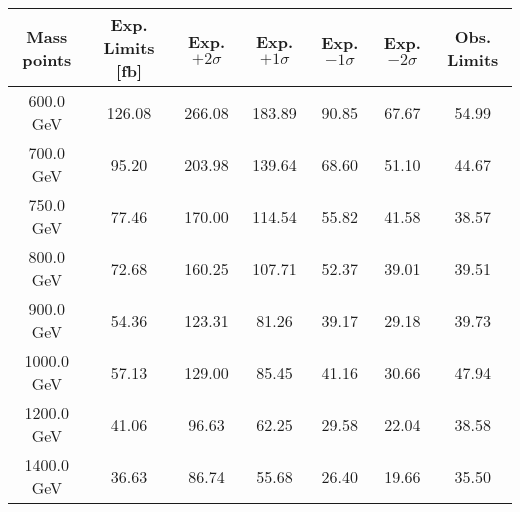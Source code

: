 
\begin{table}
\begin{center}
\begin{tabular}{c|cccccc}
\hline
\hline
Mass points & Exp. Limits [fb] & Exp. $+2\sigma$ & Exp. $+1\sigma$ &  Exp. $-1\sigma$  &  Exp. $-2\sigma$ & Obs. Limits \\
\hline
600.0 GeV  &  126.08  & 266.08  & 183.89  & 90.85  & 67.67   & 54.99\\
700.0 GeV  &  95.20  & 203.98  & 139.64  & 68.60  & 51.10   & 44.67\\
750.0 GeV  &  77.46  & 170.00  & 114.54  & 55.82  & 41.58   & 38.57\\
800.0 GeV  &  72.68  & 160.25  & 107.71  & 52.37  & 39.01   & 39.51\\
900.0 GeV  &  54.36  & 123.31  & 81.26  & 39.17  & 29.18   & 39.73\\
1000.0 GeV  &  57.13  & 129.00  & 85.45  & 41.16  & 30.66   & 47.94\\
1200.0 GeV  &  41.06  & 96.63  & 62.25  & 29.58  & 22.04   & 38.58\\
1400.0 GeV  &  36.63  & 86.74  & 55.68  & 26.40  & 19.66   & 35.50\\

\hline
\hline
\end{tabular}
\end{center}
\end{table}
